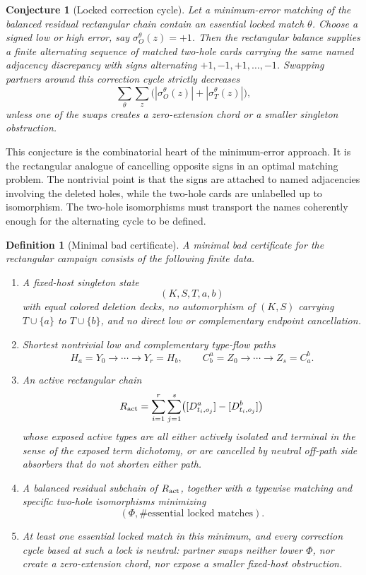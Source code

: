 \documentclass[11pt]{article}
\newtheorem{conjecture}{Conjecture}
\newtheorem{definition}{Definition}
\begin{document}
\begin{conjecture}[Locked correction cycle]
Let a minimum-error matching of the balanced residual rectangular chain
contain an essential locked match \(\theta\).  Choose a signed low or high
error, say
\(\sigma_O^\theta(z)=+1\).  Then the rectangular balance supplies a finite
alternating sequence of matched two-hole cards carrying the same named
adjacency discrepancy with signs alternating \(+1,-1,+1,\ldots,-1\).  Swapping
partners around this correction cycle strictly decreases
\[
  \sum_\theta\sum_z
    \bigl(|\sigma_O^\theta(z)|+|\sigma_T^\theta(z)|\bigr),
\]
unless one of the swaps creates a zero-extension chord or a smaller
singleton obstruction.
\end{conjecture}

This conjecture is the combinatorial heart of the minimum-error approach.
It is the rectangular analogue of cancelling opposite signs in an optimal
matching problem.  The nontrivial point is that the signs are attached to
named adjacencies involving the deleted holes, while the two-hole cards are
unlabelled up to isomorphism.  The two-hole isomorphisms must transport the
names coherently enough for the alternating cycle to be defined.

\begin{definition}[Minimal bad certificate]
A minimal bad certificate for the rectangular campaign consists of the
following finite data.

\begin{enumerate}[leftmargin=2em]
  \item A fixed-host singleton state
  \[
    (K,S,T,a,b)
  \]
  with equal colored deletion decks, no automorphism of \((K,S)\) carrying
  \(T\cup\{a\}\) to \(T\cup\{b\}\), and no direct low or complementary endpoint
  cancellation.

  \item Shortest nontrivial low and complementary type-flow paths
  \[
    H_a=Y_0\to\cdots\to Y_r=H_b,
    \qquad
    C_b^a=Z_0\to\cdots\to Z_s=C_a^b.
  \]

  \item An active rectangular chain
  \[
    R_{\rm act}
    =
    \sum_{i=1}^r\sum_{j=1}^s
      \bigl([D_{t_i,o_j}^a]-[D_{t_i,o_j}^b]\bigr)
  \]
  whose exposed active types are all either actively isolated and terminal in
  the sense of the exposed term dichotomy, or are cancelled by neutral
  off-path side absorbers that do not shorten either path.

  \item A balanced residual subchain of \(R_{\rm act}\), together with a
  typewise matching and specific two-hole isomorphisms minimizing
  \[
    (\Phi,\#\text{essential locked matches}).
  \]

  \item At least one essential locked match in this minimum, and every
  correction cycle based at such a lock is neutral: partner swaps neither
  lower \(\Phi\), nor create a zero-extension chord, nor expose a smaller
  fixed-host obstruction.
\end{enumerate}
\end{definition}
\end{document}
